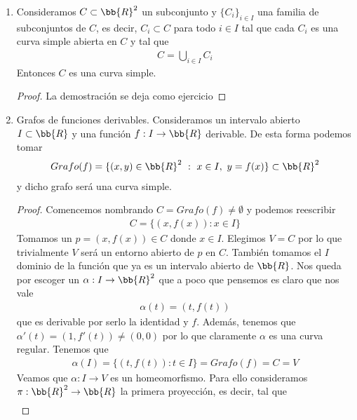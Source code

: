 \begin{ejemplo}
\begin{enumerate}
        \item\label{ej:union} Consideramos $C\subset \bb{R}^2$ un subconjunto y $\{C_i\}_{i\in I}$ una familia de subconjuntos de $C$, es decir, $C_i\subset C$ para todo $i\in I$ tal que cada $C_i$ es una curva simple abierta en $C$ y tal que 
        \begin{gather*}
            C = \bigcup_{i\in I} C_i
        \end{gather*}
        Entonces $C$ es una curva simple.
        \begin{proof}
            La demostración se deja como ejercicio
        \end{proof}

        \item\label{ej:grafo} Grafos de funciones derivables. Consideramos un intervalo abierto $I\subset \bb{R}$ y una función $f: I\to \bb{R}$ derivable. De esta forma podemos tomar
        \begin{gather*}
            Grafo(f) = \{(x,y) \in \bb{R}^2 \ : \ x\in I,\ y=f(x)\} \subset \bb{R}^2
        \end{gather*}
        y dicho grafo será una curva simple.
        \begin{proof}
            Comencemos nombrando $C=Grafo(f)\neq \emptyset$ y podemos reescribir
            \begin{gather*}
                C = \{(x,f(x)) : x\in I\}
            \end{gather*}
            Tomamos un $p=(x,f(x))\in C$ donde $x\in I$. Elegimos $V=C$ por lo que trivialmente $V$ será un entorno abierto de $p$ en $C$. También tomamos el $I$ dominio de la función que ya es un intervalo abierto de $\bb{R}$. Nos queda por escoger un $\alpha:I \to \bb{R}^2$ que a poco que pensemos es claro que nos vale
            \begin{gather*}
                \alpha(t) = (t,f(t))
            \end{gather*}  
            que es derivable por serlo la identidad y $f$. Además, tenemos que $\alpha'(t) = (1, f'(t)) \neq (0,0)$ por lo que claramente $\alpha$ es una curva regular. Tenemos que
            \begin{gather*}
                \alpha(I) = \{(t, f(t)) : t\in I\} = Grafo(f) = C = V
            \end{gather*}
            Veamos que $\alpha : I \to V$ es un homeomorfismo. Para ello consideramos $\pi:\bb{R}^2 \to \bb{R}$ la primera proyección, es decir, tal que
            \begin{gather*}

\end{gather*}
\end{proof}
\end{enumerate}
\end{ejemplo}
